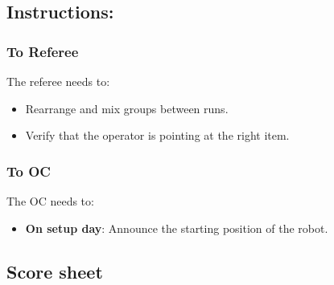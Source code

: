 \subsection*{Instructions:}

\subsubsection*{To Referee}

The referee needs to:
\begin{itemize}[nosep]
	\item Rearrange and mix groups between runs.
	\item Verify that the operator is pointing at the right item.
\end{itemize}

\subsubsection*{To OC}
The OC needs to:
\begin{itemize}[nosep]
	\item \textbf{On setup day}: Announce the starting position of the robot.
\end{itemize}



\subsection*{Score sheet}


